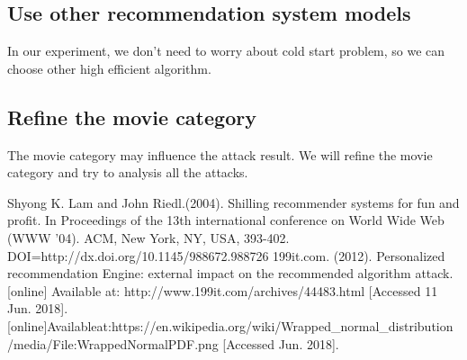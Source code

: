 \documentclass[a4paper, 12pt]{article}
\theoremstyle{definition}
\begin{document}
\subsection{Use other recommendation system models}
In our experiment, we don't need to worry about cold start problem, so we can choose other high efficient algorithm.
\subsection{Refine the movie category}
The movie category may influence the attack result. We will refine the movie category and try to analysis all the attacks.






\newpage
\begin{thebibliography}{}
	\bibitem{[1]}Shyong K. Lam and John Riedl.(2004). Shilling recommender systems for fun and profit. In Proceedings of the 13th international conference on World Wide Web (WWW '04). ACM, New York, NY, USA, 393-402. DOI=http://dx.doi.org/10.1145/988672.988726
	\bibitem{[2]}199it.com. (2012). Personalized recommendation Engine: external impact on the recommended algorithm attack. [online] Available at: http://www.199it.com/archives/44483.html [Accessed 11 Jun. 2018].
	\bibitem{[3]}[online]Availableat:https://en.wikipedia.org/wiki/Wrapped\_normal\_distribution\\/media/File:WrappedNormalPDF.png [Accessed  Jun. 2018].
\end{thebibliography}
\end{document}
